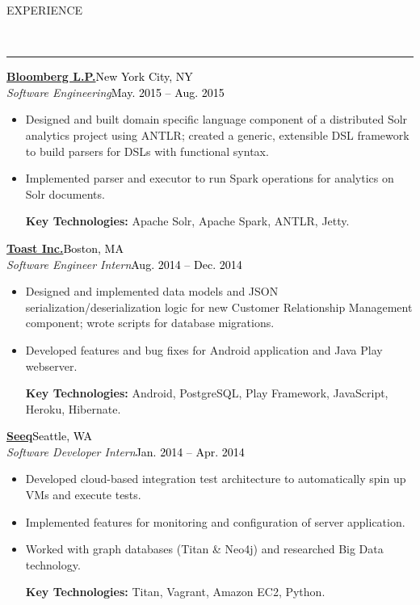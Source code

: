\documentclass[11pt, letterpaper, oneside]{article}
\newcommand{\HRule}[2]{\textcolor{#1}{\rule{\linewidth}{#2}}}
\newcommand{\sectiontitle}[1]{\begin{minipage}{\textwidth}\vspace{-7.5pt}\begin{flushleft}\hspace{-20.5pt}\vspace{-25pt}
\Large\MakeUppercase{#1}\end{flushleft}\end{minipage}\\\HRule{black}{0.15mm}\vspace{\baselineskip}}
\newenvironment{ressection}[1]{
  \sectiontitle{#1}}
  {\vspace{-\baselineskip}}
\newcommand{\resentryheader}[4]{
    \vspace{-6pt}
    \textbf{#1}\hspace{\stretch{1}}\textcolor{black}{#3}\\
    \textit{#2}\hspace{\stretch{1}}\textcolor{black}{#4}\\
}
\newcommand{\resitem}[1]{
    \vspace{2pt}
    \item \begin{flushleft} #1 \end{flushleft}
}
\newenvironment{resentry}[4]{
  \begin{minipage}{\textwidth}
  \vspace{-3pt}
    \resentryheader{#1}{#2}{#3}{#4}
        \vspace{-\baselineskip}
    \begin{itemize}[noitemsep,nolistsep]
}{
    \end{itemize}
        \vspace{\baselineskip}
        \end{minipage}
}
\begin{document}
\begin{ressection}{Experience}
  \begin{resentry}{\href{http://www.bloomberg.com/professional/}{Bloomberg L.P.}}{Software Engineering}{New York City, NY}{May. 2015 -- Aug. 2015}
    \resitem{Designed and built domain specific language component of a distributed Solr analytics project using ANTLR; created a generic, extensible DSL framework to build parsers for DSLs with functional syntax.}
    \resitem{Implemented parser and executor to run Spark operations for analytics on Solr documents.}
    \vspace{3pt} \hspace{-15pt}
    \textbf{Key Technologies:} Apache Solr, Apache Spark, ANTLR, Jetty.
    \vspace{6pt} 
  \end{resentry}  
  \begin{resentry}{\href{http://pos.toasttab.com/}{Toast Inc.}}{Software Engineer Intern}{Boston, MA}{Aug. 2014 -- Dec. 2014}
   \resitem{Designed and implemented data models and JSON serialization/deserialization logic for new Customer Relationship Management component; wrote scripts for database migrations. }
    \resitem{Developed features and bug fixes for Android application and Java Play webserver.}
    \vspace{3pt}  \hspace{-15pt}
    \textbf{Key Technologies:} Android, PostgreSQL, Play Framework, JavaScript, Heroku, Hibernate.
	\vspace{6pt}   
  \end{resentry}  
  \begin{resentry}{\href{http://www.seeq.com/}{Seeq}}{Software Developer Intern}{Seattle, WA}{Jan. 2014 -- Apr. 2014}
    \resitem{Developed cloud-based integration test architecture to automatically spin up VMs and execute tests.}
    \resitem{Implemented features for monitoring and configuration of server application.}
    \resitem{Worked with graph databases (Titan \& Neo4j) and researched Big Data technology.}
    \vspace{3pt} \hspace{-15pt}
    \textbf{Key Technologies:} Titan, Vagrant, Amazon EC2, Python.
	\vspace{6pt}   
  \end{resentry}
\end{ressection}

\vspace{4pt}
\end{document}
